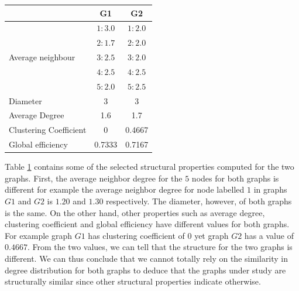 \documentclass[10pt,a4paper]{article}
\theoremstyle{plain}
\theoremstyle{definition}
\begin{document}
\begin{table}[H]
	\centering
	\renewcommand{\arraystretch}{1.2}
	\begin{tabular}{|l|c|c|}
		\hline
		&G1 & G2 \\
		\hline
		\multirow{5}{*}{Average neighbour} & $1:3.0$ & $1: 2.0$\\
		& $2: 1.7$ & $2:2.0$\\
		& $3: 2.5$ & $3:2.0 $ \\
		& $4: 2.5$ & $4:2.5 $ \\ 
		& $5: 2.0$ & $5:2.5 $ \\
		\hline
		Diameter & 3 & 3 \\
		\hline
		Average Degree & 1.6 & 1.7 \\
		\hline
		Clustering Coefficient & 0 &0.4667 \\
		\hline
		Global efficiency & 0.7333 & 0.7167 \\
		\hline
	\end{tabular} 
    \label{table-properties}
\end{table}

Table \ref{table-properties} contains some of the selected structural properties computed for the two graphs. First, the average neighbor degree for the $5$ nodes for both graphs is different for example the average neighbor degree for node labelled $1$ in graphs $G1$ and $G2$ is  $1.20$ and $1.30$ respectively. The diameter, however, of both graphs is the same. On the other hand, other properties such as average degree, clustering coefficient and global efficiency have different values for both graphs. For example graph $G1$ has clustering coefficient of $0$ yet graph $G2$  has a value of $0.4667$. From the two values, we can tell that the structure for the two graphs is different.
We can thus conclude that we cannot totally rely on the similarity in degree distribution for both graphs to deduce that the graphs under study are structurally similar since other structural properties indicate otherwise.
\end{document}
